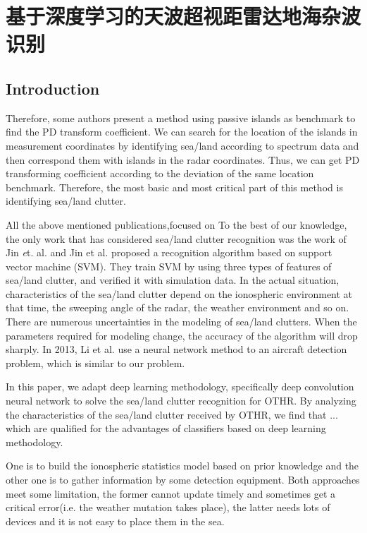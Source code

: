 \chapter{基于深度学习的天波超视距雷达地海杂波识别}
\section{Introduction}
%

Therefore, some authors present a method using passive islands as benchmark to find the PD transform coefficient\cite{cuccoli2011coordinate}. We can search for the location of the islands in measurement coordinates by identifying sea/land according to spectrum data and then correspond them with islands in the radar coordinates. Thus, we can get PD transforming coefficient according to the deviation of the same location benchmark. Therefore, the most basic and most critical part of this method is identifying sea/land clutter.

All the above mentioned publications,focused on To the best of our knowledge, the only work that has considered sea/land clutter recognition was the work of Jin {\emph et. al.} \cite{jin2012svm} and Jin et al. \cite{jin2012svm} proposed a recognition algorithm based on support vector machine (SVM). They train SVM by using three types of features of sea/land clutter, and verified it with simulation data. In the actual situation, characteristics of the sea/land clutter depend on the ionospheric environment at that time, the sweeping angle of the radar, the weather environment and so on. There are numerous uncertainties in the modeling of sea/land clutters. When the parameters required for modeling change, the accuracy of the algorithm will drop sharply. In 2013, Li et al. \cite{li2013high} use a neural network method to an aircraft detection problem, which is similar to our problem.


In this paper, we adapt deep learning methodology, specifically deep convolution neural network to solve the sea/land clutter recognition for OTHR. By analyzing the characteristics of the sea/land clutter received by OTHR, we find that ... which are qualified for the advantages of classifiers based on deep learning methodology.


One is to build the ionospheric statistics model based on prior knowledge and the other one is to gather information by some detection equipment. Both approaches meet some limitation, the former cannot update timely and sometimes get a critical error(i.e. the weather mutation takes place), the latter needs lots of devices and it is not easy to place them in the sea.

